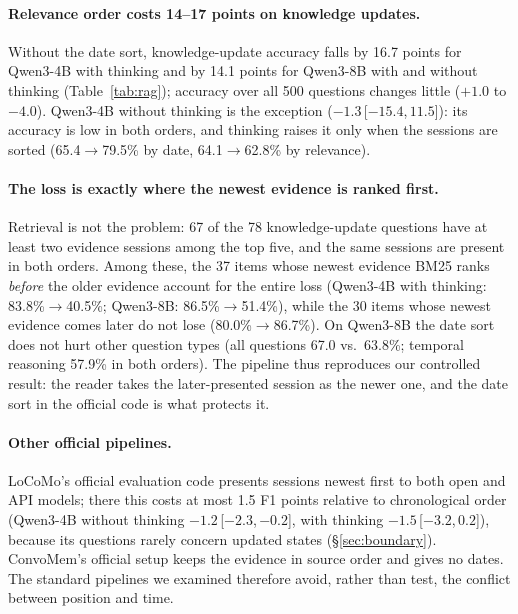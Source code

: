 \documentclass[11pt]{article}
\newcommand{\ci}[2]{\,[$#1$,\,$#2$]}
\begin{document}
\paragraph{Relevance order costs 14--17 points on knowledge updates.}
Without the date sort, knowledge-update accuracy falls by 16.7 points for Qwen3-4B with thinking and by 14.1 points for Qwen3-8B with and without thinking (Table~\ref{tab:rag}); accuracy over all 500 questions changes little ($+1.0$ to $-4.0$). Qwen3-4B without thinking is the exception ($-1.3$\ci{-15.4}{11.5}): its accuracy is low in both orders, and thinking raises it only when the sessions are sorted (65.4$\rightarrow$79.5\% by date, 64.1$\rightarrow$62.8\% by relevance).

\paragraph{The loss is exactly where the newest evidence is ranked first.}
Retrieval is not the problem: 67 of the 78 knowledge-update questions have at least two evidence sessions among the top five, and the same sessions are present in both orders. Among these, the 37 items whose newest evidence BM25 ranks \emph{before} the older evidence account for the entire loss (Qwen3-4B with thinking: 83.8\%$\rightarrow$40.5\%; Qwen3-8B: 86.5\%$\rightarrow$51.4\%), while the 30 items whose newest evidence comes later do not lose (80.0\%$\rightarrow$86.7\%). On Qwen3-8B the date sort does not hurt other question types (all questions 67.0 vs.\ 63.8\%; temporal reasoning 57.9\% in both orders). The pipeline thus reproduces our controlled result: the reader takes the later-presented session as the newer one, and the date sort in the official code is what protects it.

\paragraph{Other official pipelines.}
LoCoMo's official evaluation code presents sessions newest first to both open and API models; there this costs at most 1.5 F1 points relative to chronological order (Qwen3-4B without thinking $-1.2$\ci{-2.3}{-0.2}, with thinking $-1.5$\ci{-3.2}{0.2}), because its questions rarely concern updated states (\S\ref{sec:boundary}). ConvoMem's official setup keeps the evidence in source order and gives no dates. The standard pipelines we examined therefore avoid, rather than test, the conflict between position and time.

\end{document}
